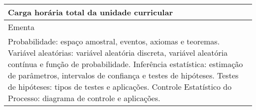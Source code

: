 \begin{quadro}[ht!]
\begin{tabular}{|p{3cm} p{2cm} p{3cm} p{2cm} p{3cm} p{2cm}|}
\multicolumn{5}{|p{13cm}|}{\cellcolor{blue1} Carga horária total da unidade curricular} & \multicolumn{1}{p{1cm}|}{\raggedleft 60	}\\\hline
\multicolumn{6}{|p{15cm}|}{\cellcolor{blue1} Ementa} \\\hline
\hline\multicolumn{6}{|p{15cm}|}{\scriptsize Probabilidade: espaço amostral, eventos, axiomas e teoremas. Variável aleatórias: variável aleatória discreta, variável aleatória contínua e função de probabilidade. Inferência estatística: estimação de parâmetros, intervalos de confiança e testes de hipóteses. Testes de hipóteses: tipos de testes e aplicações. Controle Estatístico do Processo: diagrama de controle e aplicações.}\\\hline
\hline
	\end{tabular}
\end{quadro}
\clearpage
